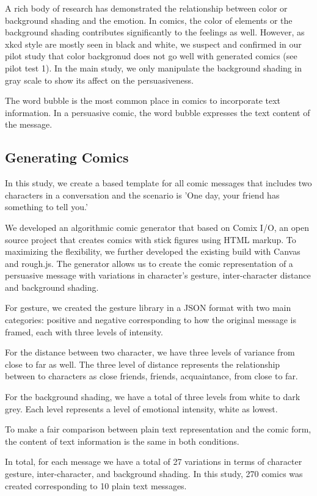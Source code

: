 A rich body of research has demonstrated the relationship between color or background shading and the emotion. In comics, the color of elements or the background shading contributes significantly to the feelings as well. However, as xkcd style are mostly seen in black and white, we suspect and confirmed in our pilot study that color backgronud does not go well with generated comics (see pilot test 1). In the main study, we only manipulate the background shading in gray scale to show its affect on the persuasiveness. \par
The word bubble is the most common place in comics to incorporate text information. In a persuasive comic, the word bubble expresses the text content of the message.  \par

\subsection{Generating Comics}
In this study, we create a based template for all comic messages that includes two characters in a conversation and the scenario is 'One day, your friend has something to tell you.'\par

We developed an algorithmic comic generator that based on Comix I/O, an open source project that creates comics with stick figures using HTML markup. To maximizing the flexibility, we further developed the existing build with Canvas and rough.js. The generator allows us to create the comic representation of a persuasive message with variations in character’s gesture, inter-character distance and background shading.\par
For gesture, we created the gesture library in a JSON format with two main categories: positive and negative corresponding to how the original message is framed, each with three levels of intensity. \par
For the distance between two character, we have three levels of variance from close to far as well. The three level of distance represents the relationship between to characters as close friends, friends, acquaintance, from close to far. \par
For the background shading, we have a total of three levels from white to dark grey. Each level represents a level of emotional intensity, white as lowest. \par
To make a fair comparison between plain text representation and the comic form, the content of text information is the same in both conditions.  \par
In total, for each message we have a total of 27 variations in terms of character gesture, inter-character, and background shading. In this study, 270 comics was created corresponding to 10 plain text messages. \par

